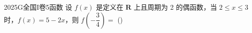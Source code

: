 
\begin{problem}{2025}{G}{全国I卷}{5}{函数}
设 $f(x)$ 是定义在 $\mathbf{R}$ 上且周期为 2 的偶函数，当 $2 \leqslant x \leqslant 3$ 时，$f(x)=5-2x$，则 $f\left(-\dfrac{3}{4}\right)=$
(\hspace{1cm})
\begin{choices}
\end{choices}
\end{problem}